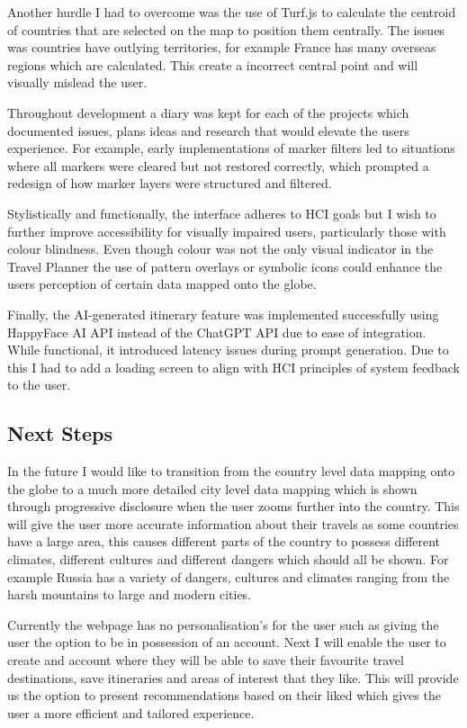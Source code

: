 \documentclass[]{project_final}
\begin{document}
Another hurdle I had to overcome was the use of Turf.js to calculate the centroid of countries that are selected on the map to position them centrally. The issues was countries have outlying territories, for example France has many overseas regions which are calculated. This create a incorrect central point and will visually mislead the user.

Throughout development a diary was kept for each of the projects which documented issues, plans ideas and research that would elevate the users experience. For example, early implementations of marker filters led to situations where all markers were cleared but not restored correctly, which prompted a redesign of how marker layers were structured and filtered.

Stylistically and functionally, the interface adheres to HCI goals but I wish to further improve accessibility for visually impaired users, particularly those with colour blindness. Even though colour was not the only visual indicator in the Travel Planner the use of pattern overlays or symbolic icons could enhance the users perception of certain data mapped onto the globe.

Finally, the AI-generated itinerary feature was implemented successfully using HappyFace AI API instead of the ChatGPT API due to ease of integration. While functional, it introduced latency issues during prompt generation. Due to this I had to add a loading screen to align with HCI principles of system feedback to the user.
\subsection{Next Steps}

In the future I would like to transition from the country level data mapping onto the globe to a much more detailed city level data mapping which is shown through progressive disclosure when the user zooms further into the country. This will give the user more accurate information about their travels as some countries have a large area, this causes different parts of the country to possess different climates, different cultures and different dangers which should all be shown. For example Russia has a variety of dangers, cultures and climates ranging from the harsh mountains to large and modern cities.

Currently the webpage has no personalisation's for the user such as giving the user the option to be in possession of an account. Next I will enable the user to create and account where they will be able to save their favourite travel destinations, save itineraries and areas of interest that they like. This will provide us the option to present recommendations based on their liked which gives the user a more efficient and tailored experience.
\end{document}
